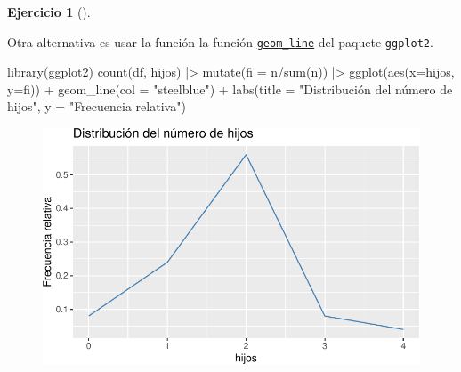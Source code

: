\documentclass[
  a4paper,
]{scrreport}
\newenvironment{Shaded}{\begin{snugshade}}{\end{snugshade}}
\newcommand{\AttributeTok}[1]{\textcolor[rgb]{0.40,0.45,0.13}{#1}}
\newcommand{\FunctionTok}[1]{\textcolor[rgb]{0.28,0.35,0.67}{#1}}
\newcommand{\NormalTok}[1]{\textcolor[rgb]{0.00,0.23,0.31}{#1}}
\newcommand{\SpecialCharTok}[1]{\textcolor[rgb]{0.37,0.37,0.37}{#1}}
\newcommand{\StringTok}[1]{\textcolor[rgb]{0.13,0.47,0.30}{#1}}
\theoremstyle{definition}
\newtheorem{exercise}{Ejercicio}[chapter]
\theoremstyle{remark}
\begin{document}
\begin{exercise}[]
\begin{enumerate}
\begin{tcolorbox}
  Otra alternativa es usar la función la función
  \href{https://aprendeconalf.es/manual-r/07-graficos.html\#diagramas-de-lineas}{\texttt{geom\_line}}
  del paquete \texttt{ggplot2}.

\begin{Shaded}
\begin{Highlighting}[]
\FunctionTok{library}\NormalTok{(ggplot2)}
\FunctionTok{count}\NormalTok{(df, hijos) }\SpecialCharTok{|\textgreater{}} 
    \FunctionTok{mutate}\NormalTok{(}\AttributeTok{fi =}\NormalTok{ n}\SpecialCharTok{/}\FunctionTok{sum}\NormalTok{(n)) }\SpecialCharTok{|\textgreater{}}
    \FunctionTok{ggplot}\NormalTok{(}\FunctionTok{aes}\NormalTok{(}\AttributeTok{x=}\NormalTok{hijos, }\AttributeTok{y=}\NormalTok{fi)) }\SpecialCharTok{+}
    \FunctionTok{geom\_line}\NormalTok{(}\AttributeTok{col =} \StringTok{"steelblue"}\NormalTok{) }\SpecialCharTok{+}
    \FunctionTok{labs}\NormalTok{(}\AttributeTok{title =} \StringTok{"Distribución del número de hijos"}\NormalTok{, }\AttributeTok{y =} \StringTok{"Frecuencia relativa"}\NormalTok{)}
\end{Highlighting}
\end{Shaded}

  \begin{figure}[H]

  {\centering \includegraphics{03-frecuencias-graficos_files/figure-pdf/unnamed-chunk-9-1.pdf}

  }

  \end{figure}

  \end{tcolorbox}
\end{enumerate}

\end{exercise}
\end{document}

